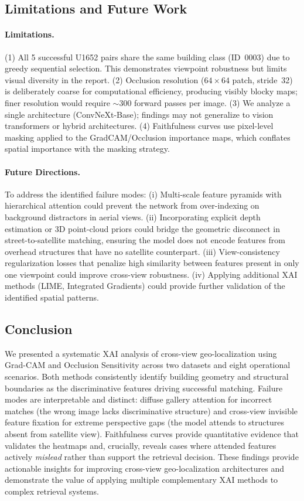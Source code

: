 \documentclass{article}
\begin{document}
\subsection{Limitations and Future Work}

\paragraph{Limitations.}
(1) All 5 successful U1652 pairs share the same building class (ID~0003) due to greedy sequential selection. This demonstrates viewpoint robustness but limits visual diversity in the report.
(2) Occlusion resolution ($64{\times}64$ patch, stride~32) is deliberately coarse for computational efficiency, producing visibly blocky maps; finer resolution would require ${\sim}300$ forward passes per image.
(3) We analyze a single architecture (ConvNeXt-Base); findings may not generalize to vision transformers or hybrid architectures.
(4) Faithfulness curves use pixel-level masking applied to the GradCAM/Occlusion importance maps, which conflates spatial importance with the masking strategy.

\paragraph{Future Directions.}
To address the identified failure modes:
(i) Multi-scale feature pyramids with hierarchical attention could prevent the network from over-indexing on background distractors in aerial views.
(ii) Incorporating explicit depth estimation or 3D point-cloud priors could bridge the geometric disconnect in street-to-satellite matching, ensuring the model does not encode features from overhead structures that have no satellite counterpart.
(iii) View-consistency regularization losses that penalize high similarity between features present in only one viewpoint could improve cross-view robustness.
(iv) Applying additional XAI methods (LIME, Integrated Gradients) could provide further validation of the identified spatial patterns.

\subsection{Conclusion}

We presented a systematic XAI analysis of cross-view geo-localization using Grad-CAM and Occlusion Sensitivity across two datasets and eight operational scenarios.
Both methods consistently identify building geometry and structural boundaries as the discriminative features driving successful matching.
Failure modes are interpretable and distinct: diffuse gallery attention for incorrect matches (the wrong image lacks discriminative structure) and cross-view invisible feature fixation for extreme perspective gaps (the model attends to structures absent from satellite view).
Faithfulness curves provide quantitative evidence that validates the heatmaps and, crucially, reveals cases where attended features actively \emph{mislead} rather than support the retrieval decision.
These findings provide actionable insights for improving cross-view geo-localization architectures and demonstrate the value of applying multiple complementary XAI methods to complex retrieval systems.




\end{document}
